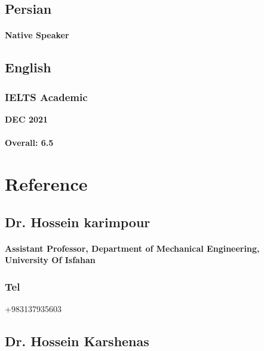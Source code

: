 \documentclass[a4paper]{article}
\begin{document}
    \subsection{Persian}
        \paragraph{Native Speaker}

    \subsection{English}
        \subsubsection{IELTS Academic}
        \hfill
        {\bfseries DEC 2021}
        \paragraph{Overall: 6.5}

    \section{Reference}

        \subsection{Dr. Hossein karimpour}
        \paragraph{\bfseries Assistant Professor, Department of Mechanical Engineering, University Of Isfahan}

        \subsubsection{\large Tel} {\large +983137935603}
        
        \Large\href{mailto:h.karimpour@eng.ui.ac.ir}{}
        \Large\href{http://eng.ui.ac.ir/~h.karimpour}{}
        \Large\href{https://www.linkedin.com/in/hossein-karimpour-38373811a}{}

        \subsection{Dr. Hossein Karshenas}
\end{document}
